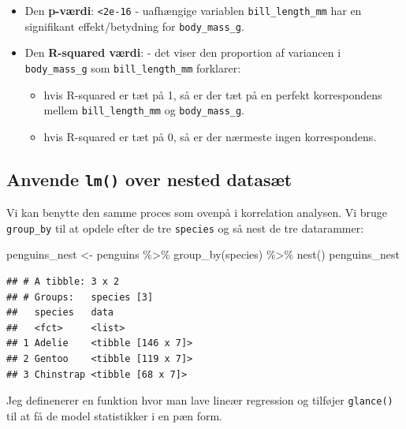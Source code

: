 \documentclass[
]{book}
\newenvironment{Shaded}{\begin{snugshade}}{\end{snugshade}}
\newcommand{\FunctionTok}[1]{\textcolor[rgb]{0.00,0.00,0.00}{#1}}
\newcommand{\NormalTok}[1]{#1}
\newcommand{\OtherTok}[1]{\textcolor[rgb]{0.56,0.35,0.01}{#1}}
\newcommand{\SpecialCharTok}[1]{\textcolor[rgb]{0.00,0.00,0.00}{#1}}
\providecommand{\tightlist}{%
  \setlength{\itemsep}{0pt}\setlength{\parskip}{0pt}}
\begin{document}
\begin{itemize}
\tightlist
\item
  Den \textbf{p-værdi}: \texttt{\textless{}2e-16} - uafhængige variablen \texttt{bill\_length\_mm} har en signifikant effekt/betydning for \texttt{body\_mass\_g}.
\item
  Den \textbf{R-squared værdi}: - det viser den proportion af variancen i \texttt{body\_mass\_g} som \texttt{bill\_length\_mm} forklarer:

  \begin{itemize}
  \tightlist
  \item
    hvis R-squared er tæt på 1, så er der tæt på en perfekt korrespondens mellem \texttt{bill\_length\_mm} og \texttt{body\_mass\_g}.
  \item
    hvis R-squared er tæt på 0, så er der nærmeste ingen korrespondens.
  \end{itemize}
\end{itemize}

\hypertarget{anvende-lm-over-nested-datasuxe6t}{%
\subsection{\texorpdfstring{Anvende \texttt{lm()} over nested datasæt}{Anvende lm() over nested datasæt}}\label{anvende-lm-over-nested-datasuxe6t}}

Vi kan benytte den samme proces som ovenpå i korrelation analysen. Vi bruge \texttt{group\_by} til at opdele efter de tre \texttt{species} og så nest de tre datarammer:

\begin{Shaded}
\begin{Highlighting}[]
\NormalTok{penguins\_nest }\OtherTok{\textless{}{-}}\NormalTok{ penguins }\SpecialCharTok{\%\textgreater{}\%} 
  \FunctionTok{group\_by}\NormalTok{(species) }\SpecialCharTok{\%\textgreater{}\%}
  \FunctionTok{nest}\NormalTok{()}
\NormalTok{penguins\_nest}
\end{Highlighting}
\end{Shaded}

\begin{verbatim}
## # A tibble: 3 x 2
## # Groups:   species [3]
##   species   data              
##   <fct>     <list>            
## 1 Adelie    <tibble [146 x 7]>
## 2 Gentoo    <tibble [119 x 7]>
## 3 Chinstrap <tibble [68 x 7]>
\end{verbatim}

Jeg definenerer en funktion hvor man lave lineær regression og tilføjer \texttt{glance()} til at få de model statistikker i en pæn form.
\end{document}
